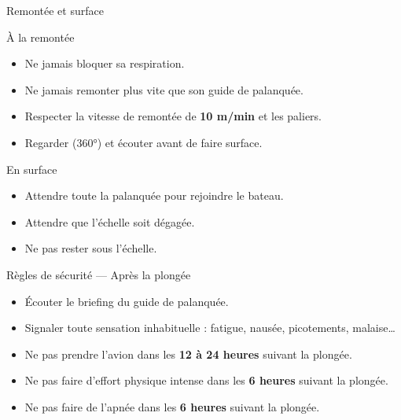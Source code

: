 \begin{frame}{Remontée et surface}

\begin{block}{À la remontée}
\begin{itemize}
  \item \alert{Ne jamais bloquer sa respiration}.
  \item Ne jamais remonter plus vite que son guide de palanquée.
  \item Respecter la vitesse de remontée de \textbf{10 m/min}
        et les paliers.
  \item Regarder (360°) et écouter avant de faire surface.
\end{itemize}
\end{block}

\vspace{0.2cm}

\begin{block}{En surface}
\begin{itemize}
  \item Attendre toute la palanquée pour rejoindre le bateau.
  \item Attendre que l’échelle soit dégagée.
  \item \alert{Ne pas rester sous l’échelle}.
\end{itemize}
\end{block}
\end{frame}

\begin{frame}{Règles de sécurité — Après la plongée}

\begin{itemize}
  \item Écouter le briefing du guide de palanquée.
  \item \alert{Signaler toute sensation inhabituelle} :
        fatigue, nausée, picotements, malaise…
  \item Ne pas prendre l’avion dans les \textbf{12 à 24 heures}
        suivant la plongée.
  \item Ne pas faire d'effort physique intense
        dans les \textbf{6 heures} suivant la plongée.
  \item Ne pas faire de l'apnée dans les \textbf{6 heures} suivant la plongée.
\end{itemize}
\end{frame}
